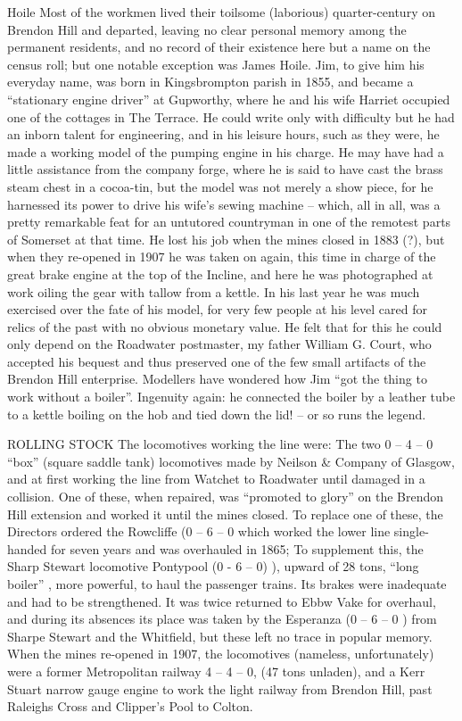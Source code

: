 \documentclass[10pt,a4paper]{article}
\begin{document}
 Hoile
      Most of the workmen lived their toilsome (laborious) quarter-century on Brendon Hill and departed, leaving no clear personal memory among the permanent residents, and no record of their existence here but a name on the census roll; but one notable exception was James Hoile.
  Jim, to give him his everyday name, was born in Kingsbrompton parish in 1855, and became a “stationary engine driver” at Gupworthy, where he and his wife Harriet occupied one of the cottages in The Terrace. He could write only with difficulty but he had an inborn talent for engineering, and in his leisure hours, such as they were, he made a working model of the pumping engine in his charge. He may have had a little assistance from the company forge, where he is said to have cast the brass steam chest in a cocoa-tin, but the model was not merely a show piece, for he harnessed its power to drive his wife’s sewing machine – which, all in all, was a pretty remarkable feat for an untutored countryman in one of the remotest parts of Somerset at that time. He lost his job when the mines closed in 1883 (?), but when they re-opened in 1907 he was taken on again, this time in charge of the great brake engine at the top of the Incline, and here he was photographed at work oiling the gear with tallow from a kettle. 
  In his last year he was much exercised over the fate of his model, for very few people at his level cared for relics of the past with no obvious monetary value. He felt that for this he could only depend on the Roadwater postmaster, my father William G. Court, who accepted his bequest and thus preserved one of the few small artifacts of the Brendon Hill enterprise.
  Modellers have wondered how Jim “got the thing to work without a boiler”. Ingenuity again: he connected the boiler by a leather tube to a kettle boiling on the hob and tied down the lid! – or so runs the legend.    
     
ROLLING STOCK
The locomotives working the line were:
The two  0 – 4 – 0 “box” (square saddle tank) locomotives made by Neilson \& Company of Glasgow, and at first working the line from Watchet to Roadwater until damaged in a collision. One of these, when repaired, was “promoted to glory” on the Brendon Hill extension and worked it until the mines closed. 
    To replace one of these, the Directors ordered the Rowcliffe (0 – 6 – 0 which worked the lower line single-handed for seven years and was overhauled in 1865; 
   To supplement this, the Sharp Stewart locomotive Pontypool (0 - 6 – 0) ), upward of 28 tons,  “long boiler” , more powerful, to haul the passenger trains. Its brakes were inadequate and had to be strengthened.  It was twice returned to Ebbw Vake for overhaul, and during its absences its place was taken by the
	Esperanza (0 – 6 – 0 ) from Sharpe Stewart and the
            Whitfield, but these left no trace in popular memory.
  When the mines re-opened in 1907, the locomotives (nameless, unfortunately) were a former Metropolitan railway 4 – 4 – 0, (47 tons unladen), and a 
   Kerr Stuart narrow gauge engine to work the light railway from Brendon Hill, past Raleighs Cross and Clipper’s Pool to Colton.  
\end{document}
